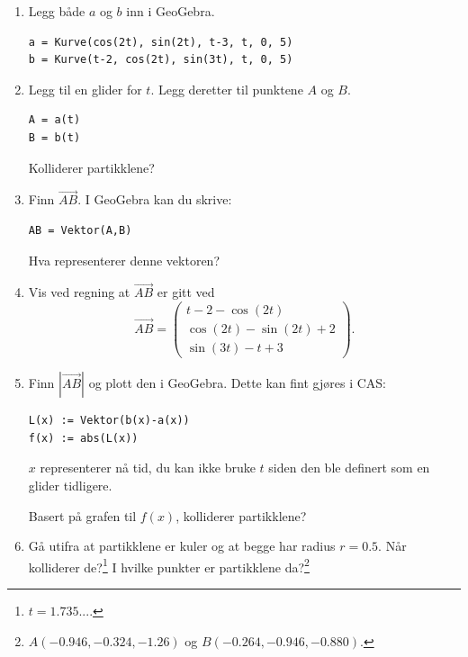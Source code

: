 \documentclass[a4paper,12pt]{article}
\begin{document}
\begin{enumerate}[label=\alph*)]
\item Legg både $a$ og $b$ inn i GeoGebra. 
\begin{lstlisting}
a = Kurve(cos(2t), sin(2t), t-3, t, 0, 5)
b = Kurve(t-2, cos(2t), sin(3t), t, 0, 5)
\end{lstlisting}

\item Legg til en glider for $t$. Legg deretter til punktene $A$ og $B$.
\begin{lstlisting}
A = a(t)
B = b(t)
\end{lstlisting}
Kolliderer partikklene?
\item Finn $\overrightarrow{AB}$. I GeoGebra kan du skrive:
\begin{lstlisting}
AB = Vektor(A,B)
\end{lstlisting}
Hva representerer denne vektoren?

\item Vis ved regning at $\overrightarrow{AB}$ er gitt ved
\[
\overrightarrow{AB} =
\begin{pmatrix}
t-2-\cos(2t) \\
\cos(2t) - \sin(2t)+2 \\
\sin(3t)-t+3
\end{pmatrix}.
\]

\item Finn $|\overrightarrow{AB}|$ og plott den i GeoGebra. Dette kan fint gjøres i CAS:
\begin{lstlisting}
L(x) := Vektor(b(x)-a(x))
f(x) := abs(L(x))
\end{lstlisting}
$x$ representerer nå tid, du kan ikke bruke $t$ siden den ble definert som en glider tidligere.

Basert på grafen til $f(x)$, kolliderer partikklene?

\item Gå utifra at partikklene er kuler og at begge har radius $r=0.5$. Når kolliderer de?\footnote{$t = 1.735...$.} I hvilke punkter er partikklene da?\footnote{$A(-0.946,-0.324,-1.26)$ og $B(-0.264,-0.946,-0.880)$.}
\end{enumerate}
\end{document}
